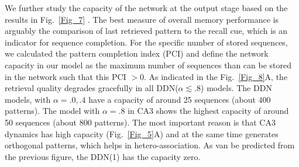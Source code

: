 \documentclass[utf8]{frontiersSCNS} %
\begin{document}
We further study the capacity of the network at the output stage based on the results in Fig.~\ref{Fig_7} . 
The best measure of overall memory performance is arguably the comparison of last retrieved pattern to the recall cue, which is an indicator for sequence completion.
%
For the specific number of stored sequences, we calculated the pattern completion index (PCI) and define the network capacity in our model as the maximum number of sequences than can be stored in the network such that this PCI $> 0$.
%
As indicated in the Fig.~\ref{Fig_8}A, the retrieval quality degrades gracefully in all DDN($\alpha \lesssim .8$)  models.
% 
The DDN models, with $\alpha = .0, .4$ have a capacity of around 25 sequences (about 400 patterns).
%
The model with $\alpha = .8$ in CA3 shows the highest capacity of around 50 sequences (about 800 patterns).
%
The most important reason is that CA3 dynamics has high capacity (Fig.~\ref{Fig_5}A) and at the same time generates orthogonal patterns, which helps in hetero-association.  
%
As van be predicted from the previous figure, the DDN(1) has the capacity zero. 
\end{document}

